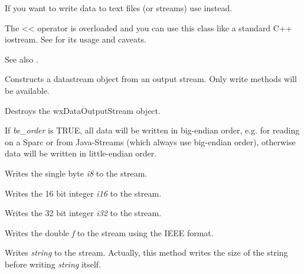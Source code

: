 If you want to write data to text files (or streams) use 
 instead.

The << operator is overloaded and you can use this class like a standard 
C++ iostream. See  for its 
usage and caveats.

See also . 


\label{wxdataoutputstreamconstr}


Constructs a datastream object from an output stream. Only write methods will
be available.





Destroys the wxDataOutputStream object.



If {\it be_order} is TRUE, all data will be written in big-endian
order, e.g. for reading on a Sparc or from Java-Streams (which
always use big-endian order), otherwise data will be written in
little-endian order.
 


Writes the single byte {\it i8} to the stream.



Writes the 16 bit integer {\it i16} to the stream.



Writes the 32 bit integer {\it i32} to the stream.



Writes the double {\it f} to the stream using the IEEE format.



Writes {\it string} to the stream. Actually, this method writes the size of
the string before writing {\it string} itself.
